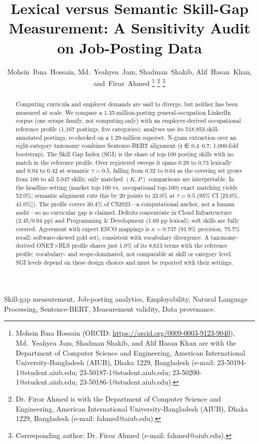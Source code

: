 \documentclass[journal]{IEEEtran}
\title{Lexical versus Semantic Skill-Gap Measurement: A Sensitivity Audit on Job-Posting Data}
\author{Mohsin~Ibna~Hossain,
        Md.~Yeahyea~Jam,
        Shadman~Shakib,
        Alif~Hasan~Khan,
        and~Firoz~Ahmed%
\thanks{Mohsin Ibna Hossain (ORCID: \url{https://orcid.org/0009-0003-9123-9040}), Md.~Yeahyea Jam, Shadman Shakib, and Alif Hasan Khan are with the Department of Computer Science and Engineering, American International University-Bangladesh (AIUB), Dhaka 1229, Bangladesh (e-mail: 23-50194-1@student.aiub.edu; 23-50187-1@student.aiub.edu; 23-50200-1@student.aiub.edu; 23-50186-1@student.aiub.edu).}%
\thanks{Dr. Firoz Ahmed is with the Department of Computer Science and Engineering, American International University-Bangladesh (AIUB), Dhaka 1229, Bangladesh (e-mail: fahmed@aiub.edu).}%
\thanks{Corresponding author: Dr. Firoz Ahmed (e-mail: fahmed@aiub.edu).}%
}
\begin{document}
\maketitle

\begin{abstract}
Computing curricula and employer demands are said to diverge, but neither has been measured at scale. We compare a 1.35-million-posting general-occupation LinkedIn corpus (one scrape family, not computing-only) with an employer-derived occupational reference profile (1,167 postings, five categories); analyses use its 518,953 skill-annotated postings, re-checked on a 1.29-million superset. N-gram extraction over an eight-category taxonomy combines Sentence-BERT alignment (τ ∈ {0.4–0.7}; 1,000-fold bootstrap). The Skill Gap Index (SGI) is the share of top-100 posting skills with no match in the reference profile. Over registered sweeps it spans 0.29 to 0.73 lexically and 0.04 to 0.42 at semantic $\tau = 0.5$, falling from 0.32 to 0.04 as the covering set grows from 100 to all 5,047 skills; only matched $(K, P)$ comparisons are interpretable. In the headline setting (market top-100 vs.\ occupational top-100) exact matching yields 52.0\%; semantic alignment cuts this by 20 points to 32.0\% at $\tau = 0.5$ (95\% CI [23.0\%, 41.0\%]). The profile covers 30.4\% of CS2023—a computational anchor, not a human audit—so no curricular gap is claimed. Deficits concentrate in Cloud Infrastructure (2.45/0.94 pp) and Programming \& Development (1.69 pp lexical); soft skills are fully covered. Agreement with expert ESCO mappings is $\kappa = 0.737$ (91.9\% precision, 75.7\% recall; software-skewed gold set), consistent with vocabulary divergence. A taxonomy-derived O\*NET$\times$BLS profile shares just 1.0\% of its 8,613 terms with the reference profile: vocabulary- and scope-dominated, not comparable at skill or category level. SGI levels depend on these design choices and must be reported with their settings.
\end{abstract}

\begin{IEEEkeywords}
Skill-gap measurement, Job-posting analytics, Employability, Natural Language Processing, Sentence-BERT, Measurement validity, Data provenance.
\end{IEEEkeywords}

\end{document}
